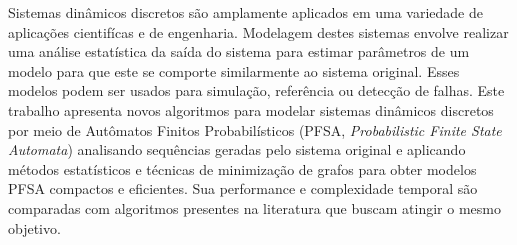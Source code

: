Sistemas din\^{a}micos discretos s\~{a}o amplamente aplicados em uma variedade de aplica\c{c}\~{o}es cientif\'{i}cas e de engenharia. Modelagem destes sistemas envolve realizar uma an\'{a}lise estat\'{i}stica da sa\'{i}da do sistema para estimar par\^{a}metros de um modelo para que este se comporte similarmente ao sistema original. Esses modelos podem ser usados para simula\c{c}\~{a}o, refer\^{e}ncia ou detec\c{c}\~{a}o de falhas. Este trabalho apresenta novos algoritmos para modelar sistemas din\^{a}micos discretos por meio de Aut\^{o}matos Finitos Probabil\'{i}sticos (PFSA, \textit{Probabilistic Finite State Automata}) analisando sequ\^{e}ncias geradas pelo sistema original e aplicando m\'{e}todos estat\'{i}sticos e t\'{e}cnicas de minimiza\c{c}\~{a}o de grafos para obter modelos PFSA compactos e eficientes. Sua performance e complexidade temporal s\~{a}o comparadas com algoritmos presentes na literatura que buscam atingir o mesmo objetivo.